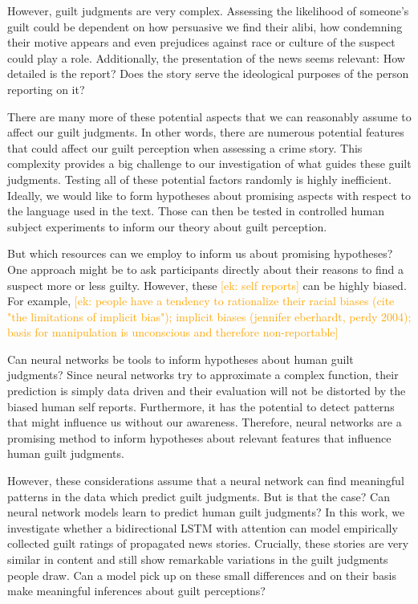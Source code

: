 \documentclass[11pt,a4paper]{article}
\newcommand{\ek}[1]{\textcolor{Orange}{[ek: #1]}}
\begin{document}
However, guilt judgments are very complex. Assessing the likelihood of someone's guilt could be dependent on how persuasive we find their alibi, how condemning their motive appears and even prejudices against race or culture of the suspect could play a role. Additionally, the presentation of the news seems relevant: How detailed is the report? Does the story serve the ideological purposes of the person reporting on it? 

There are many more of these potential aspects that we can reasonably assume to affect our guilt judgments. In other words, there are numerous potential features that could affect our guilt perception when assessing a crime story. This complexity provides a big challenge to our investigation of what guides these guilt judgments. Testing all of these potential factors randomly is highly inefficient. Ideally, we would like to form hypotheses about promising aspects with respect to the language used in the text. Those can then be tested in controlled human subject experiments to inform our theory about guilt perception.

But which resources can we employ to inform us about promising hypotheses? One approach might be to ask participants directly about their reasons to find a suspect more or less guilty. However, these \ek{self reports} can be highly biased. For example, \ek{people have a tendency to rationalize their racial biases (cite "the limitations of implicit bias"); implicit biases (jennifer eberhardt, perdy 2004); basis for manipulation is unconscious and therefore non-reportable}

Can neural networks be tools to inform hypotheses about human guilt judgments? Since neural networks try to approximate a complex function, their prediction is simply data driven and their evaluation will not be distorted by the biased human self reports. Furthermore, it has the potential to detect patterns that might influence us without our awareness. Therefore, neural networks are a promising method to inform hypotheses about relevant features that influence human guilt judgments.

However, these considerations assume that a neural network can find meaningful patterns in the data which predict guilt judgments. But is that the case? Can neural network models learn to predict human guilt judgments? In this work, we investigate whether a bidirectional LSTM with attention can model empirically collected guilt ratings of propagated news stories. Crucially, these stories are very similar in content and still show remarkable variations in the guilt judgments people draw. Can a model pick up on these small differences and on their basis make meaningful inferences about guilt perceptions?
\end{document}
